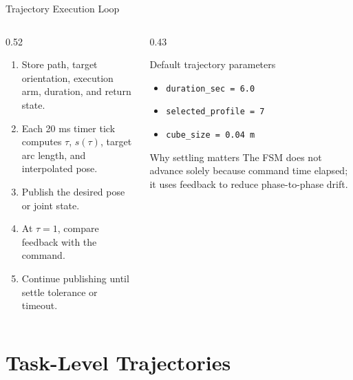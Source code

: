 \documentclass[10pt,aspectratio=169]{beamer}
\begin{document}
\begin{frame}{Trajectory Execution Loop}
  \begin{columns}[T]
    \begin{column}{0.52\textwidth}
      \begin{enumerate}
        \item Store path, target orientation, execution arm, duration, and return state.
        \item Each 20 ms timer tick computes $\tau$, $s(\tau)$, target arc length, and interpolated pose.
        \item Publish the desired pose or joint state.
        \item At $\tau=1$, compare feedback with the command.
        \item Continue publishing until settle tolerance or timeout.
      \end{enumerate}
    \end{column}
    \begin{column}{0.43\textwidth}
      \begin{block}{Default trajectory parameters}
        \begin{itemize}
          \item \texttt{duration\_sec = 6.0}
          \item \texttt{selected\_profile = 7}
          \item \texttt{cube\_size = 0.04 m}
        \end{itemize}
      \end{block}
      \begin{block}{Why settling matters}
        The FSM does not advance solely because command time elapsed; it uses feedback to reduce phase-to-phase drift.
      \end{block}
    \end{column}
  \end{columns}
\end{frame}

\section{Task-Level Trajectories}
\end{document}
